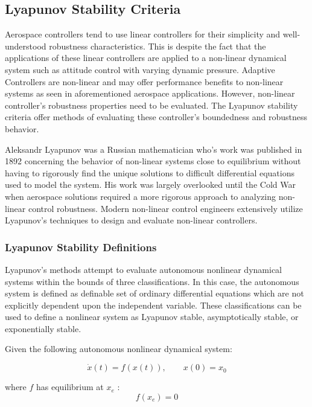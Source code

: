 \subsection{Lyapunov Stability Criteria}

Aerospace controllers tend to use linear controllers for their simplicity and well-understood robustness characteristics.  This is despite the fact that the applications of these linear controllers are applied to a non-linear dynamical system such as attitude control with varying dynamic pressure.  Adaptive Controllers are non-linear and may offer performance benefits to non-linear systems as seen in aforementioned aerospace applications.  However, non-linear controller's robustness properties need to be evaluated.  The Lyapunov stability criteria offer methods of evaluating these controller's boundedness and robustness behavior.

Aleksandr Lyapunov was a Russian mathematician who's work was published in 1892 \cite{lyapunov1892general} concerning the behavior of non-linear systems close to equilibrium without having to rigorously find the unique solutions to difficult differential equations used to model the system.  His work was largely overlooked until the Cold War when aerospace solutions required a more rigorous approach to analyzing non-linear control robustness.  Modern non-linear control engineers extensively utilize Lyapunov's techniques to design and evaluate non-linear controllers.

\subsubsection{Lyapunov Stability Definitions}

Lyapunov's methods attempt to evaluate autonomous nonlinear dynamical systems within the bounds of three classifications.  In this case, the autonomous system is defined as definable set of ordinary differential equations which are not explicitly dependent upon the independent variable.  These classifications can be used to define a nonlinear system as Lyapunov stable, asymptotically stable, or exponentially stable.

Given the following autonomous nonlinear dynamical system:

 \begin{equation}
\dot{x}(t)=f(x(t)), \qquad x(0)=x_0
\end{equation}

where $f$ has equilibrium at $x_e$ :
 \begin{equation}
f(x_e) = 0
\end{equation}

